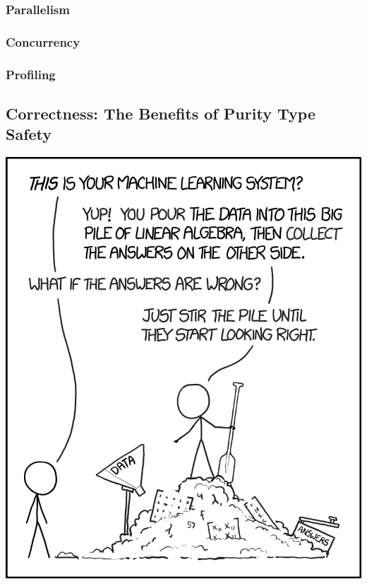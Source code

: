 \documentclass{beamer}
\begin{document}
\begin{frame}
  \frametitle{Parallelism}

\end{frame}

\begin{frame}
  \frametitle{Concurrency}

\end{frame}

\begin{frame}
  \frametitle{Profiling}

\end{frame}

\subsection{Correctness: The Benefits of Purity Type Safety}

\begin{frame}
  \begin{center}
    \includegraphics[height=.85\paperheight]{images/ml.png}
  \end{center}
\end{frame}
\end{document}
